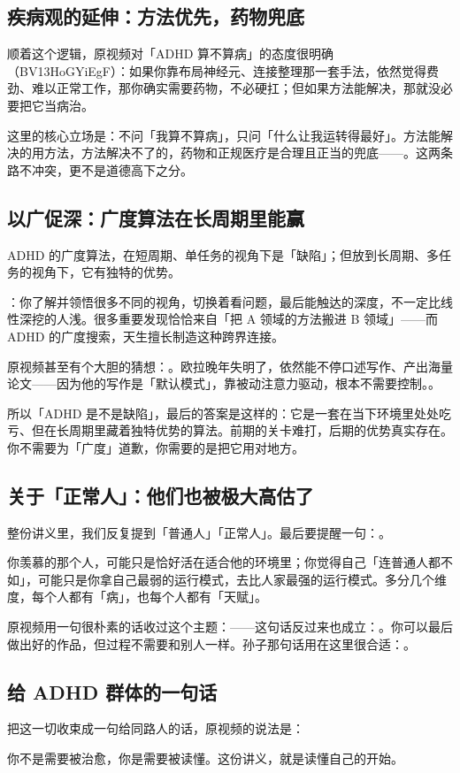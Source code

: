 \subsection{疾病观的延伸：方法优先，药物兜底}

顺着这个逻辑，原视频对「ADHD 算不算病」的态度很明确（BV13HoGYiEgF）：如果你靠布局神经元、连接整理那一套手法，依然觉得费劲、难以正常工作，那你确实需要药物，不必硬扛；但如果方法能解决，那就没必要把它当病治。

这里的核心立场是：不问「我算不算病」，只问「什么让我运转得最好」。方法能解决的用方法，方法解决不了的，药物和正规医疗是合理且正当的兜底——。这两条路不冲突，更不是道德高下之分。

\subsection{以广促深：广度算法在长周期里能赢}

ADHD 的广度算法，在短周期、单任务的视角下是「缺陷」；但放到长周期、多任务的视角下，它有独特的优势。

：你了解并领悟很多不同的视角，切换着看问题，最后能触达的深度，不一定比线性深挖的人浅。很多重要发现恰恰来自「把 A 领域的方法搬进 B 领域」——而 ADHD 的广度搜索，天生擅长制造这种跨界连接。

原视频甚至有个大胆的猜想：。欧拉晚年失明了，依然能不停口述写作、产出海量论文——因为他的写作是「默认模式」，靠被动注意力驱动，根本不需要控制。。

\begin{insight}
所以「ADHD 是不是缺陷」，最后的答案是这样的：它是一套在当下环境里处处吃亏、但在长周期里藏着独特优势的算法。前期的关卡难打，后期的优势真实存在。你不需要为「广度」道歉，你需要的是把它用对地方。
\end{insight}

\subsection{关于「正常人」：他们也被极大高估了}

整份讲义里，我们反复提到「普通人」「正常人」。最后要提醒一句：。

你羡慕的那个人，可能只是恰好活在适合他的环境里；你觉得自己「连普通人都不如」，可能只是你拿自己最弱的运行模式，去比人家最强的运行模式。多分几个维度，每个人都有「病」，也每个人都有「天赋」。

原视频用一句很朴素的话收过这个主题：——这句话反过来也成立：。你可以最后做出好的作品，但过程不需要和别人一样。孙子那句话用在这里很合适：。

\subsection{给 ADHD 群体的一句话}

把这一切收束成一句给同路人的话，原视频的说法是：


你不是需要被治愈，你是需要被读懂。这份讲义，就是读懂自己的开始。
